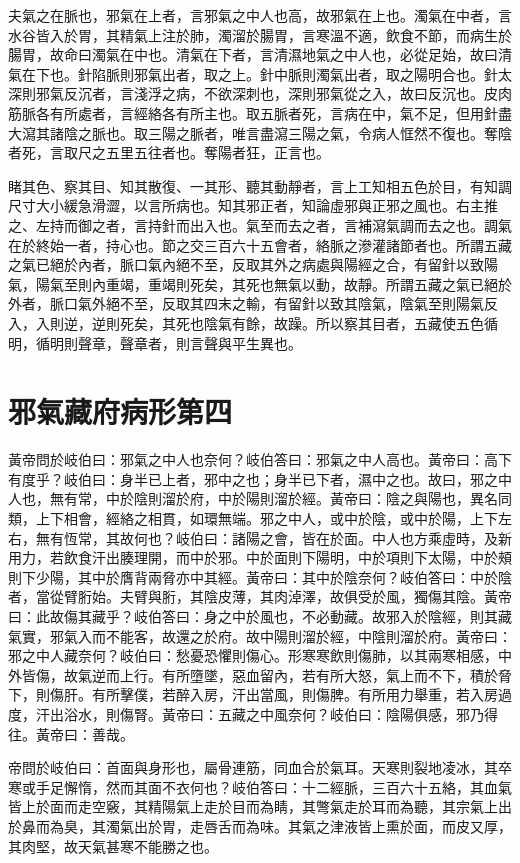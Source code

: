 夫氣之在脈也，邪氣在上者，言邪氣之中人也高，故邪氣在上也。濁氣在中者，言水谷皆入於胃，其精氣上注於肺，濁溜於腸胃，言寒溫不適，飲食不節，而病生於腸胃，故命曰濁氣在中也。清氣在下者，言清濕地氣之中人也，必從足始，故曰清氣在下也。針陷脈則邪氣出者，取之上。針中脈則濁氣出者，取之陽明合也。針太深則邪氣反沉者，言淺浮之病，不欲深刺也，深則邪氣從之入，故曰反沉也。皮肉筋脈各有所處者，言經絡各有所主也。取五脈者死，言病在中，氣不足，但用針盡大瀉其諸陰之脈也。取三陽之脈者，唯言盡瀉三陽之氣，令病人恇然不復也。奪陰者死，言取尺之五里五往者也。奪陽者狂，正言也。

睹其色、察其目、知其散復、一其形、聽其動靜者，言上工知相五色於目，有知調尺寸大小緩急滑澀，以言所病也。知其邪正者，知論虛邪與正邪之風也。右主推之、左持而御之者，言持針而出入也。氣至而去之者，言補瀉氣調而去之也。調氣在於終始一者，持心也。節之交三百六十五會者，絡脈之滲灌諸節者也。所謂五藏之氣已絕於內者，脈口氣內絕不至，反取其外之病處與陽經之合，有留針以致陽氣，陽氣至則內重竭，重竭則死矣，其死也無氣以動，故靜。所謂五藏之氣已絕於外者，脈口氣外絕不至，反取其四末之輸，有留針以致其陰氣，陰氣至則陽氣反入，入則逆，逆則死矣，其死也陰氣有餘，故躁。所以察其目者，五藏使五色循明，循明則聲章，聲章者，則言聲與平生異也。




\section{邪氣藏府病形第四}

黃帝問於岐伯曰：邪氣之中人也奈何？岐伯答曰：邪氣之中人高也。黃帝曰：高下有度乎？岐伯曰：身半已上者，邪中之也；身半已下者，濕中之也。故曰，邪之中人也，無有常，中於陰則溜於府，中於陽則溜於經。黃帝曰：陰之與陽也，異名同類，上下相會，經絡之相貫，如環無端。邪之中人，或中於陰，或中於陽，上下左右，無有恆常，其故何也？岐伯曰：諸陽之會，皆在於面。中人也方乘虛時，及新用力，若飲食汗出腠理開，而中於邪。中於面則下陽明，中於項則下太陽，中於頰則下少陽，其中於膺背兩脅亦中其經。黃帝曰：其中於陰奈何？岐伯答曰：中於陰者，當從臂胻始。夫臂與胻，其陰皮薄，其肉淖澤，故俱受於風，獨傷其陰。黃帝曰：此故傷其藏乎？岐伯答曰：身之中於風也，不必動藏。故邪入於陰經，則其藏氣實，邪氣入而不能客，故還之於府。故中陽則溜於經，中陰則溜於府。黃帝曰：邪之中人藏奈何？岐伯曰：愁憂恐懼則傷心。形寒寒飲則傷肺，以其兩寒相感，中外皆傷，故氣逆而上行。有所墮墜，惡血留內，若有所大怒，氣上而不下，積於脅下，則傷肝。有所擊僕，若醉入房，汗出當風，則傷脾。有所用力舉重，若入房過度，汗出浴水，則傷腎。黃帝曰：五藏之中風奈何？岐伯曰：陰陽俱感，邪乃得往。黃帝曰：善哉。

帝問於岐伯曰：首面與身形也，屬骨連筋，同血合於氣耳。天寒則裂地凌冰，其卒寒或手足懈惰，然而其面不衣何也？岐伯答曰：十二經脈，三百六十五絡，其血氣皆上於面而走空竅，其精陽氣上走於目而為睛，其彆氣走於耳而為聽，其宗氣上出於鼻而為臭，其濁氣出於胃，走唇舌而為味。其氣之津液皆上熏於面，而皮又厚，其肉堅，故天氣甚寒不能勝之也。

